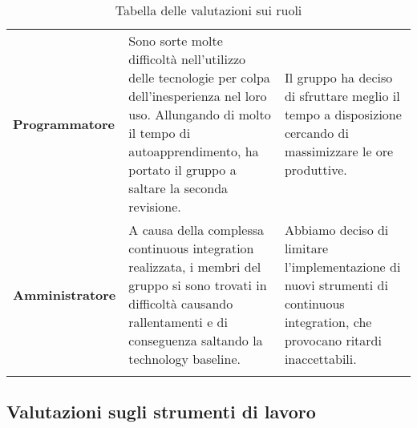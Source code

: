 \documentclass[../piano-di-qualifica.tex]{subfiles}
\begin{document}
\begin{longtable}[H]{>{\centering\bfseries}m{4cm} >{\centering\arraybackslash}m{6cm} >{\centering\arraybackslash}m{6cm}}
  Programmatore                 & Sono sorte molte difficoltà nell'utilizzo delle tecnologie per colpa dell'inesperienza nel loro uso. Allungando di molto il tempo di autoapprendimento, ha portato il gruppo a saltare la seconda revisione.  & Il gruppo ha deciso di sfruttare meglio il tempo a disposizione cercando di massimizzare le ore produttive.                                                                     \\
  Amministratore                & A causa della complessa continuous integration realizzata, i membri del gruppo si sono trovati in difficoltà causando rallentamenti e di conseguenza saltando la technology baseline.                         & Abbiamo deciso di limitare l'implementazione di nuovi strumenti di continuous integration, che provocano ritardi inaccettabili.                                                 \\
  \rowcolor{white}
  \caption{Tabella delle valutazioni sui ruoli}%
  \label{tab:valutazioni_ruoli}
\end{longtable}

\newpage
\subsection{Valutazioni sugli strumenti di lavoro}
\end{document}
